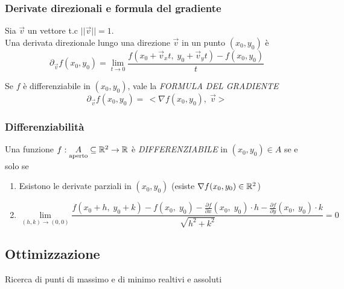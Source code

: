 \subsubsection{Derivate direzionali e formula del gradiente}
Sia $\vec{v}$ un vettore t.c $|| \vec{v} || = 1$.\\
Una derivata direzionale lungo una direzione $\vec{v}$ in un punto $(x_0, y_0)$ è
\begin{equation}
    \partial_{\vec{v}} f (x_0, y_0) = \lim_{t \to 0} \frac{f(x_0 + \vec{v}_x  t, \; y_0 + \vec{v}_y  t) - f(x_0, y_0)}{t}
\end{equation}

Se $f$ è differenziabile in $(x_0, y_0)$, vale la \emph{FORMULA DEL GRADIENTE}
\begin{equation}
    \partial_{\vec{v}} f (x_0, y_0) = \,< \nabla f(x_0, y_0) ,    \; \vec{v} >
\end{equation}

\subsubsection{Differenziabilità}
Una funzione $f : \underset{\mbox{\scriptsize{aperto}}}{A} \subseteq \mathbb{R}^2 \to \mathbb{R}$ è \emph{DIFFERENZIABILE} in $(x_0, y_0) \in A$ se e solo se
\begin{enumerate}
    \item Esistono le derivate parziali in $(x_0, y_0)$ (esiste $\nabla f (x_0, y_0) \in \mathbb{R}^2$)
    \item \[ \lim_{(h,k)\to (0,0)} \frac{f(x_0 + h, \; y_0 + k) - f(x_0, \;y_0) - \frac{\partial f}{\partial x} (x_0, \; y_0) \cdot h - \frac{\partial f}{\partial y} (x_0, \; y_0) \cdot k}{\sqrt{h^2 + k^2}} = 0  \]
\end{enumerate}

\subsection{Ottimizzazione}
Ricerca di punti di massimo e di minimo realtivi e assoluti\\

